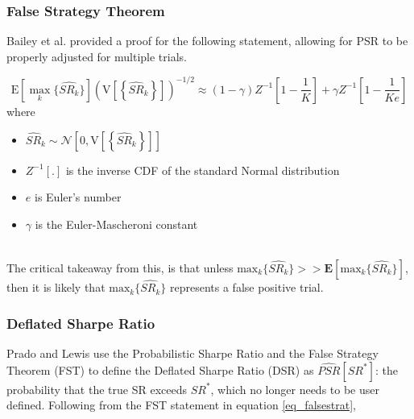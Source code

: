 \documentclass[a4paper,11pt,oneside]{article}
\theoremstyle{plain}
\theoremstyle{definition}
\begin{document}
	\subsubsection{False Strategy Theorem}\label{imp_fst}
	
	Bailey et al. \cite{Baileyetal2014} provided a proof for the following statement, allowing for PSR to be properly adjusted for multiple trials.
	
	\begin{equation}\label{eq_falsestrat}
		\mathrm{E}\left[{\max_k}\{\widehat{SR_k}\}\right]\left(\mathrm{V}\left[\left\{\widehat{S R}_{k}\right\}\right]\right)^{-1 / 2}\approx(1-\gamma) Z^{-1}\left[1-\frac{1}{K}\right]+\gamma Z^{-1}\left[1-\frac{1}{K e}\right]	
	\end{equation}
		where
	\begin{itemize}
		\item [] $\widehat{S R}_{k} \sim \mathcal{N}\left[0, \mathrm{V}\left[\left\{\widehat{S R}_{k}\right\}\right]\right]$
		\item [] $Z^{-1}[.]$ is the inverse CDF of the standard Normal distribution
		\item [] $e$ is Euler's number
		\item [] $\gamma$ is the Euler-Mascheroni constant
	\end{itemize}
	~\\
	The critical takeaway from this, is that unless $\mathrm{max}_k\{\widehat{SR_k}\} >> \mathbf{E}\left[\mathrm{max}_k\{\widehat{SR_k}\}\right]$, then it is likely that $\mathrm{max}_k\{\widehat{SR_k}\}$ represents a false positive trial.
		
		
	
	\subsubsection{Deflated Sharpe Ratio}\label{imp_dsr_detail}
	
	Prado and Lewis use the Probabilistic Sharpe Ratio and the False Strategy Theorem (FST) to define the Deflated Sharpe Ratio (DSR) as $\widehat{PSR}[SR^*]$: the probability that the true SR exceeds $SR^*$, which no longer needs to be user defined. Following from the FST statement in equation \ref{eq_falsestrat}, 
	
\end{document}
